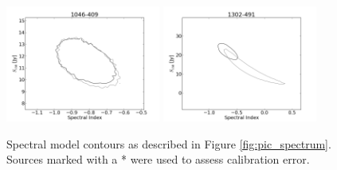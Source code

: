 \documentclass[preprint]{aastex}
\begin{document}
\begin{figure}[htbp]
\begin{center}
\includegraphics[width=2in]{plots/1046-409_SI_MCMC.png} %
\includegraphics[width=2in]{plots/1302-491_SI_MCMC.png} %
\end{center}
\caption{Spectral model contours as described in Figure \ref{fig:pic_spectrum}. Sources marked with a
* were used to assess calibration error.
}\label{fig:SI_contour_2}
\end{figure}
\clearpage
\end{document}

